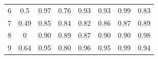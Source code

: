\documentclass[twoside,11pt]{article}
\begin{document}
\begin{table}[H]
{\begin{tabular}{cccccccc}
\multicolumn{1}{|c|}{6}     & \multicolumn{1}{c|}{0.5}                                                            & \multicolumn{1}{c|}{\cellcolor[HTML]{ECF4FF}0.97}                                                             & \multicolumn{1}{c|}{0.76}                                                                               & \multicolumn{1}{c|}{0.93}                                                                               & \multicolumn{1}{c|}{0.93}                                                                               & \multicolumn{1}{c|}{\cellcolor[HTML]{FFCCC9}0.99}                                                          & \multicolumn{1}{c|}{0.83}                                                                                  \\ \cline{1-1}
\multicolumn{1}{|c|}{7}     & \multicolumn{1}{c|}{0.49}                                                           & \multicolumn{1}{c|}{0.85}                                                                                     & \multicolumn{1}{c|}{0.84}                                                                               & \multicolumn{1}{c|}{0.82}                                                                               & \multicolumn{1}{c|}{0.86}                                                                               & \multicolumn{1}{c|}{\cellcolor[HTML]{ECF4FF}0.87}                                                          & \multicolumn{1}{c|}{\cellcolor[HTML]{FFCCC9}0.89}                                                          \\ \cline{1-1}
\multicolumn{1}{|c|}{8}     & \multicolumn{1}{c|}{0}                                                              & \multicolumn{1}{c|}{\cellcolor[HTML]{ECF4FF}0.90}                                                             & \multicolumn{1}{c|}{0.89}                                                                               & \multicolumn{1}{c|}{0.87}                                                                               & \multicolumn{1}{c|}{\cellcolor[HTML]{ECF4FF}0.90}                                                       & \multicolumn{1}{c|}{\cellcolor[HTML]{ECF4FF}0.90}                                                          & \multicolumn{1}{c|}{\cellcolor[HTML]{FFCCC9}0.98}                                                          \\ \cline{1-1}
\multicolumn{1}{|c|}{9}     & \multicolumn{1}{c|}{0.64}                                                           & \multicolumn{1}{c|}{0.95}                                                                                     & \multicolumn{1}{c|}{0.80}                                                                               & \multicolumn{1}{c|}{\cellcolor[HTML]{ECF4FF}0.96}                                                       & \multicolumn{1}{c|}{0.95}                                                                               & \multicolumn{1}{c|}{\cellcolor[HTML]{FFCCC9}0.99}                                                          & \multicolumn{1}{c|}{0.94}                                                                                  \\ \cline{1-1}

\end{tabular}}
\end{table}
\end{document}
